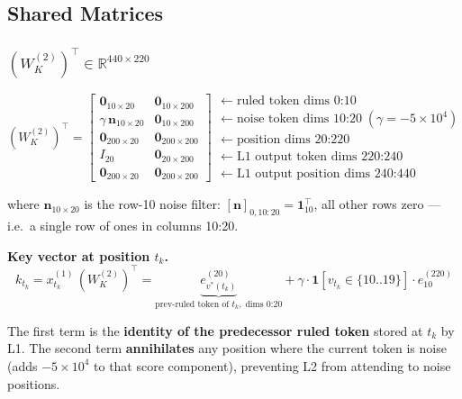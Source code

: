 \documentclass[11pt]{article}
\newcommand{\R}{\mathbb{R}}
\begin{document}
\subsection{Shared Matrices}

\subsubsection{$(W_K^{(2)})^\top\in\R^{440\times220}$}

\begin{equation}
(W_K^{(2)})^\top=
\begin{bmatrix}
\mathbf{0}_{10\times20}           & \mathbf{0}_{10\times200}\\
\gamma\,\boldsymbol{n}_{10\times20} & \mathbf{0}_{10\times200}\\
\mathbf{0}_{200\times20}          & \mathbf{0}_{200\times200}\\
I_{20}                            & \mathbf{0}_{20\times200}\\
\mathbf{0}_{200\times20}          & \mathbf{0}_{200\times200}
\end{bmatrix}
\begin{array}{l}
\leftarrow\text{ruled token dims }0\text{:}10\\
\leftarrow\text{noise token dims }10\text{:}20\;(\gamma=-5\times10^4)\\
\leftarrow\text{position dims }20\text{:}220\\
\leftarrow\text{L1 output token dims }220\text{:}240\\
\leftarrow\text{L1 output position dims }240\text{:}440
\end{array}
\tag{12}
\end{equation}

where $\boldsymbol{n}_{10\times20}$ is the row-10 noise filter: $[\boldsymbol{n}]_{0,10:20}=\mathbf{1}_{10}^\top$,
all other rows zero --- i.e.\ a single row of ones in columns 10:20.

\medskip
\textbf{Key vector at position $t_k$.}
\[
k_{t_k}=x_{t_k}^{(1)}\,(W_K^{(2)})^\top
=\underbrace{e_{v^*(t_k)}^{(20)}}_{\text{prev-ruled token of }t_k,\;\text{dims }0\text{:}20}
+\gamma\cdot\mathbf{1}[v_{t_k}\in\{10\text{..}19\}]\cdot e_{10}^{(220)}
\tag{13}
\]

The first term is the \textbf{identity of the predecessor ruled token} stored at $t_k$ by L1.
The second term \textbf{annihilates} any position where the current token is noise
(adds $-5\times10^4$ to that score component), preventing L2 from attending to noise positions.
\end{document}
